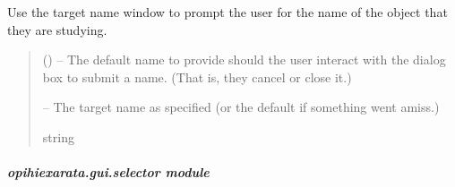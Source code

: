 \documentclass[letterpaper,11pt,english]{sphinxmanual}
\begin{document}
\begin{savenotes}\begin{fulllineitems}
\label{\detokenize{code/opihiexarata.gui.name:opihiexarata.gui.name.ask_user_target_name_window}}
\pysigstartsignatures
{}
\pysigstopsignatures
\sphinxAtStartPar
Use the target name window to prompt the user for the name of the
object that they are studying.
\begin{quote}\begin{description}
\sphinxAtStartPar
{} () – The default name to provide should the user interact with the dialog
box to submit a name. (That is, they cancel or close it.)

\sphinxAtStartPar
{} – The target name as specified (or the default if something went amiss.)

\sphinxAtStartPar
string

\end{description}\end{quote}

\end{fulllineitems}\end{savenotes}


\begin{savenotes}\begin{fulllineitems}
\label{\detokenize{code/opihiexarata.gui.name:opihiexarata.gui.name.main}}
\pysigstartsignatures
{}
\pysigstopsignatures
\end{fulllineitems}\end{savenotes}


\sphinxstepscope


\subparagraph{opihiexarata.gui.selector module}
\label{\detokenize{code/opihiexarata.gui.selector:module-opihiexarata.gui.selector}}\label{\detokenize{code/opihiexarata.gui.selector:opihiexarata-gui-selector-module}}\label{\detokenize{code/opihiexarata.gui.selector::doc}}
\end{document}
